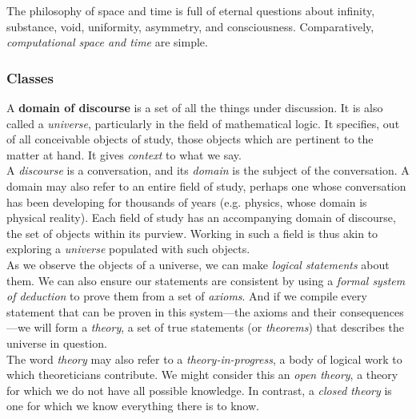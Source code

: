 The philosophy of space and time is full of eternal questions about infinity, substance, void, uniformity, asymmetry, and consciousness. Comparatively, \textit{computational space and time} are simple. \\


\subsubsection{Classes}


A \textbf{domain of discourse} is a set of all the things under discussion. It is also called a \textit{universe}, particularly in the field of mathematical logic. It specifies, out of all conceivable objects of study, those objects which are pertinent to the matter at hand. It gives \textit{context} to what we say. \\

A \textit{discourse} is a conversation, and its \textit{domain} is the subject of the conversation. A domain may also refer to an entire field of study, perhaps one whose conversation has been developing for thousands of years (e.g. physics, whose domain is physical reality). Each field of study has an accompanying domain of discourse, the set of objects within its purview. Working in such a field is thus akin to exploring a \textit{universe} populated with such objects. \\

As we observe the objects of a universe, we can make \textit{logical statements} about them. We can also ensure our statements are consistent by using a \textit{formal system of deduction} to prove them from a set of \textit{axioms}. And if we compile every statement that can be proven in this system---the axioms and their consequences---we will form a \textit{theory}, a set of true statements (or \textit{theorems}) that describes the universe in question. \\

The word \textit{theory} may also refer to a \textit{theory-in-progress}, a body of logical work to which theoreticians contribute. We might consider this an \textit{open theory}, a theory for which we do not have all possible knowledge. In contrast, a \textit{closed theory} is one for which we know everything there is to know. \\

